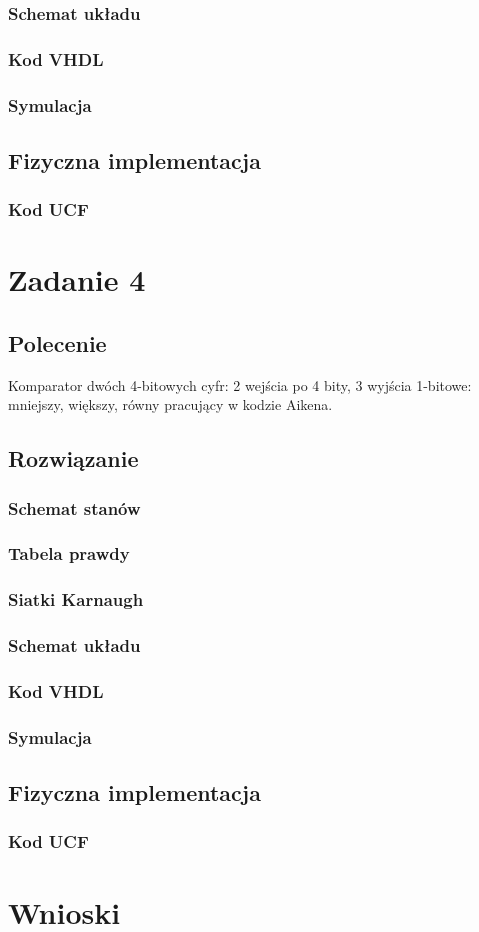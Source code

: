 \documentclass[a4paper,12pt]{extarticle}  %
\begin{document}
\subsubsection{Schemat układu}
\subsubsection{Kod VHDL}
\subsubsection{Symulacja}
\subsection{Fizyczna implementacja}
\subsubsection{Kod UCF}

\section{Zadanie 4}
\subsection{Polecenie}
Komparator dwóch 4-bitowych cyfr: 2 wejścia po 4 bity, 3 wyjścia 1-bitowe: 
mniejszy, większy, równy pracujący w kodzie Aikena.
\subsection{Rozwiązanie}
\subsubsection{Schemat stanów}
\subsubsection{Tabela prawdy}
\subsubsection{Siatki Karnaugh}
\subsubsection{Schemat układu}
\subsubsection{Kod VHDL}
\subsubsection{Symulacja}
\subsection{Fizyczna implementacja}
\subsubsection{Kod UCF}

\section{Wnioski}
\end{document}
